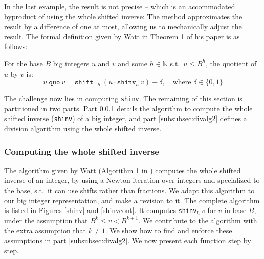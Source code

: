 In the last example, the result is not precise -- which is an accommodated
byproduct of using the whole shifted inverse: The method approximates the result
by a difference of one at most, allowing us to mechanically adjust the result.
The formal definition given by Watt in Theorem 1 of his paper
\cite{watt2023efficient} is as follows:

\begin{definition}\label{def:quo}
  For the base $B$ big integers $u$ and $v$ and some $h\in \mathbb{N}$ s.t.\
  $u \leq B^h$, the quotient of $u$ by $v$ is:
  \begin{equation}
    \label{eq:defquo}
    u~\mathtt{quo}~v = \mathtt{shift}_{-h}~ (u \cdot \mathtt{shinv}_h~v) + \delta,\quad \text{where~} \delta \in \{0,1\}
  \end{equation}
\end{definition}

The challenge now lies in computing \texttt{shinv}. The remaining of this
section is partitioned in two parts. Part \ref{subsubsec:divalg1} details the
algorithm to compute the whole shifted inverse (\texttt{shinv}) of a big
integer, and part \ref{subsubsec:divalg2} defines a division algorithm using the
whole shifted inverse.

\subsubsection{Computing the whole shifted inverse}\label{subsubsec:divalg1}
The algorithm given by Watt (Algorithm 1 in \cite{watt2023efficient}) computes
the whole shifted inverse of an integer, by using a Newton iteration over
integers and specialized to the base, s.t.\ it can use shifts rather than
fractions. We adapt this algorithm to our big integer representation, and make
a revision to it. The complete algorithm is listed in Figures \ref{shinv} and
\ref{shinvcont}. It computes \texttt{shinv}$_h~v$ for $v$ in base $B$, under the
assumption that $B^k \leq v < B^{k+1}$. We contribute to the algorithm with the
extra assumption that $k\neq 1$. We show how to find and enforce these assumptions
in part \ref{subsubsec:divalg2}. We now present each function step by step.

